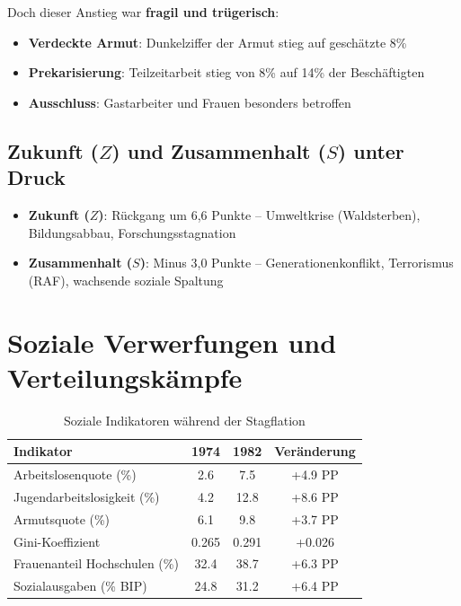 Doch dieser Anstieg war \textbf{fragil und trügerisch}:
\begin{itemize}
    \item \textbf{Verdeckte Armut}: Dunkelziffer der Armut stieg auf geschätzte 8\%
    \item \textbf{Prekarisierung}: Teilzeitarbeit stieg von 8\% auf 14\% der Beschäftigten
    \item \textbf{Ausschluss}: Gastarbeiter und Frauen besonders betroffen
\end{itemize}

\subsection{Zukunft (\(Z\)) und Zusammenhalt (\(S\)) unter Druck}

\begin{itemize}
    \item \textbf{Zukunft (\(Z\))}: Rückgang um 6,6 Punkte – Umweltkrise (Waldsterben), Bildungsabbau, Forschungsstagnation
    \item \textbf{Zusammenhalt (\(S\))}: Minus 3,0 Punkte – Generationenkonflikt, Terrorismus (RAF), wachsende soziale Spaltung
\end{itemize}

\section{Soziale Verwerfungen und Verteilungskämpfe}

\begin{table}[ht]
    \centering
    \caption{Soziale Indikatoren während der Stagflation}
    \label{tab:sozial_stagflation}
    \begin{tabular}{lccc}
        \toprule
        \textbf{Indikator} & \textbf{1974} & \textbf{1982} & \textbf{Veränderung} \\
        \midrule
        Arbeitslosenquote (\%) & 2.6 & 7.5 & +4.9 PP \\
        Jugendarbeitslosigkeit (\%) & 4.2 & 12.8 & +8.6 PP \\
        Armutsquote (\%) & 6.1 & 9.8 & +3.7 PP \\
        Gini-Koeffizient & 0.265 & 0.291 & +0.026 \\
        Frauenanteil Hochschulen (\%) & 32.4 & 38.7 & +6.3 PP \\
        Sozialausgaben (\% BIP) & 24.8 & 31.2 & +6.4 PP \\
        \bottomrule
    \end{tabular}
\end{table}

